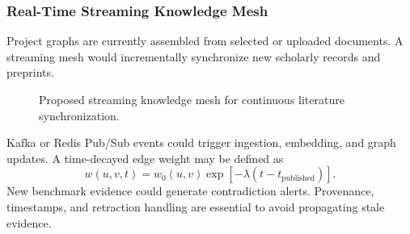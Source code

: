 \documentclass[conference]{IEEEtran}
\begin{document}
\subsubsection{Real-Time Streaming Knowledge Mesh}
Project graphs are currently assembled from selected or uploaded documents. A streaming mesh would incrementally synchronize new scholarly records and preprints.
\begin{figure}[t]\centering{}\caption{Proposed streaming knowledge mesh for continuous literature synchronization.}\label{fig:stream-mesh}\end{figure}
Kafka or Redis Pub/Sub events could trigger ingestion, embedding, and graph updates. A time-decayed edge weight may be defined as
\begin{equation}w(u,v,t)=w_0(u,v)\exp[-\lambda(t-t_{\mathrm{published}})].\end{equation}
New benchmark evidence could generate contradiction alerts. Provenance, timestamps, and retraction handling are essential to avoid propagating stale evidence.
\end{document}
